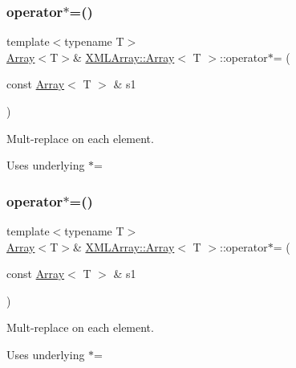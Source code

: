 \subsubsection{\texorpdfstring{operator$\ast$=()}{operator*=()}\hspace{0.1cm}{\footnotesize\ttfamily [1/4]}}
{\footnotesize\ttfamily template$<$typename T$>$ \\
\mbox{\hyperlink{classXMLArray_1_1Array}{Array}}$<$T$>$\& \mbox{\hyperlink{classXMLArray_1_1Array}{X\+M\+L\+Array\+::\+Array}}$<$ T $>$\+::operator$\ast$= (\begin{DoxyParamCaption}\item[{const \mbox{\hyperlink{classXMLArray_1_1Array}{Array}}$<$ T $>$ \&}]{s1 }\end{DoxyParamCaption})\hspace{0.3cm}{\ttfamily [inline]}}



Mult-\/replace on each element. 

Uses underlying $\ast$= \mbox{\label{classXMLArray_1_1Array_a866bd17aae2f3d1935f015a936ce9424}} 
\subsubsection{\texorpdfstring{operator$\ast$=()}{operator*=()}\hspace{0.1cm}{\footnotesize\ttfamily [2/4]}}
{\footnotesize\ttfamily template$<$typename T$>$ \\
\mbox{\hyperlink{classXMLArray_1_1Array}{Array}}$<$T$>$\& \mbox{\hyperlink{classXMLArray_1_1Array}{X\+M\+L\+Array\+::\+Array}}$<$ T $>$\+::operator$\ast$= (\begin{DoxyParamCaption}\item[{const \mbox{\hyperlink{classXMLArray_1_1Array}{Array}}$<$ T $>$ \&}]{s1 }\end{DoxyParamCaption})\hspace{0.3cm}{\ttfamily [inline]}}



Mult-\/replace on each element. 

Uses underlying $\ast$= \mbox{\label{classXMLArray_1_1Array_a4afa4c469f84b40f88c27273602528cc}} 
